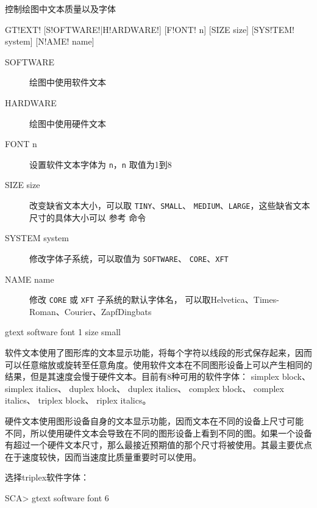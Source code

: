 \label{cmd:gtext}

控制绘图中文本质量以及字体

\begin{SACSTX}
GT!EXT! [S!OFTWARE!|H!ARDWARE!] [F!ONT! n] [SIZE size] [SYS!TEM! system] [N!AME! name]
\end{SACSTX}

\begin{description}
\item [SOFTWARE]  绘图中使用软件文本
\item [HARDWARE]  绘图中使用硬件文本
\item [FONT n] 设置软件文本字体为 \texttt{n}，\texttt{n} 取值为1到8
\item [SIZE size]  改变缺省文本大小，可以取 \texttt{TINY}、\texttt{SMALL}、
    \texttt{MEDIUM}、\texttt{LARGE}，这些缺省文本尺寸的具体大小可以
    参考  命令
\item [SYSTEM system] 修改字体子系统，可以取值为 \texttt{SOFTWARE}、
    \texttt{CORE}、\texttt{XFT}
\item [NAME name] 修改 \texttt{CORE} 或 \texttt{XFT} 子系统的默认字体名，
    可以取Helvetica、Times-Roman、Courier、ZapfDingbats
\end{description}

\begin{SACDFT}
gtext software font 1 size small
\end{SACDFT}

软件文本使用了图形库的文本显示功能，将每个字符以线段的形式保存起来，因而
可以任意缩放或旋转至任意角度。使用软件文本在不同图形设备上可以产生相同的
结果，但是其速度会慢于硬件文本。目前有8种可用的软件字体：
simplex block、
simplex italics、
duplex block、
duplex italics、
complex block、
complex italics、
triplex block、
riplex italics。

硬件文本使用图形设备自身的文本显示功能，因而文本在不同的设备上尺寸可能
不同，所以使用硬件文本会导致在不同的图形设备上看到不同的图。如果一个设备
有超过一个硬件文本尺寸，那么最接近预期值的那个尺寸将被使用。其最主要优点
在于速度较快，因而当速度比质量重要时可以使用。

选择triplex软件字体：
\begin{SACCode}
SCA> gtext software font 6
\end{SACCode}
